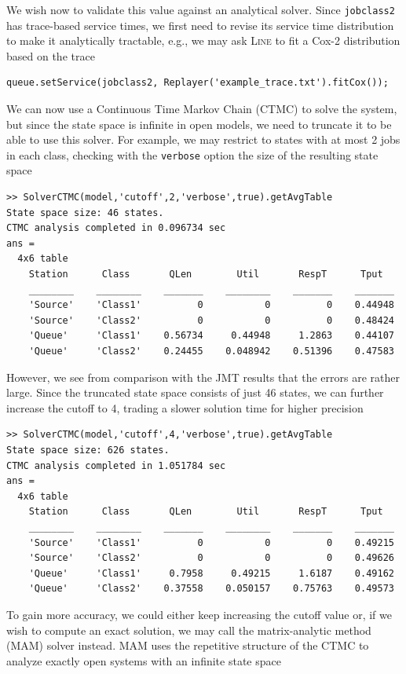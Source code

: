We wish now to validate this value against an analytical solver. Since \texttt{jobclass2} has trace-based service times, we first need to revise its service time distribution to make it analytically tractable, e.g., we may ask \textsc{Line} to fit a Cox-2 distribution based on the trace
\begin{lstlisting}
queue.setService(jobclass2, Replayer('example_trace.txt').fitCox());
\end{lstlisting}
We can now use a Continuous Time Markov Chain (CTMC) to solve the system, but since the state space is infinite in open models, we need to truncate it to be able to use this solver. For example, we may restrict to states with at most 2 jobs in each class, checking with the \texttt{verbose} option the size of the resulting state space
\begin{lstlisting}
>> SolverCTMC(model,'cutoff',2,'verbose',true).getAvgTable
State space size: 46 states.
CTMC analysis completed in 0.096734 sec
ans =
  4x6 table
    Station      Class       QLen        Util       RespT      Tput
    ________    ________    _______    ________    _______    _______
    'Source'    'Class1'          0           0          0    0.44948
    'Source'    'Class2'          0           0          0    0.48424
    'Queue'     'Class1'    0.56734     0.44948     1.2863    0.44107
    'Queue'     'Class2'    0.24455    0.048942    0.51396    0.47583
\end{lstlisting}
However, we see from comparison with the JMT results that the errors are rather large. Since the truncated state space consists of just 46 states, we can further increase the cutoff to 4, trading a slower solution time for higher precision
\begin{lstlisting}
>> SolverCTMC(model,'cutoff',4,'verbose',true).getAvgTable
State space size: 626 states.
CTMC analysis completed in 1.051784 sec
ans =
  4x6 table
    Station      Class       QLen        Util       RespT      Tput
    ________    ________    _______    ________    _______    _______
    'Source'    'Class1'          0           0          0    0.49215
    'Source'    'Class2'          0           0          0    0.49626
    'Queue'     'Class1'     0.7958     0.49215     1.6187    0.49162
    'Queue'     'Class2'    0.37558    0.050157    0.75763    0.49573
\end{lstlisting}
To gain more accuracy, we could either keep increasing the cutoff value or, if we wish to compute an exact solution, we may call the matrix-analytic method (MAM) solver instead. MAM uses the repetitive structure of the CTMC to analyze exactly open systems with an infinite state space
